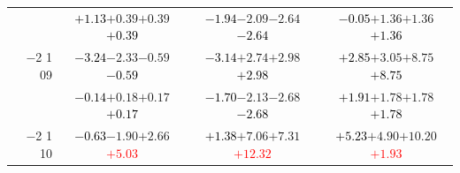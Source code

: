 \documentclass[compress]{beamer}
\begin{document}
\begin{frame}
\begin{tabular}{r | c | c | c}
          & \textcolor{black}{$+1.13$}\hspace{0.1 cm}$+0.39$\hspace{0.1 cm}$+0.39$\hspace{0.1 cm}\textcolor{black}{$+0.39$} & \textcolor{black}{$-1.94$}\hspace{0.1 cm}$-2.09$\hspace{0.1 cm}$-2.64$\hspace{0.1 cm}\textcolor{black}{$-2.64$} & \textcolor{black}{$-0.05$}\hspace{0.1 cm}$+1.36$\hspace{0.1 cm}$+1.36$\hspace{0.1 cm}\textcolor{black}{$+1.36$} \\
$-$2 1 09 & \textcolor{black}{$-3.24$}\hspace{0.1 cm}$-2.33$\hspace{0.1 cm}$-0.59$\hspace{0.1 cm}\textcolor{black}{$-0.59$} & \textcolor{black}{$-3.14$}\hspace{0.1 cm}$+2.74$\hspace{0.1 cm}$+2.98$\hspace{0.1 cm}\textcolor{black}{$+2.98$} & \textcolor{black}{$+2.85$}\hspace{0.1 cm}$+3.05$\hspace{0.1 cm}$+8.75$\hspace{0.1 cm}\textcolor{black}{$+8.75$} \\
          & \textcolor{black}{$-0.14$}\hspace{0.1 cm}$+0.18$\hspace{0.1 cm}$+0.17$\hspace{0.1 cm}\textcolor{black}{$+0.17$} & \textcolor{black}{$-1.70$}\hspace{0.1 cm}$-2.13$\hspace{0.1 cm}$-2.68$\hspace{0.1 cm}\textcolor{black}{$-2.68$} & \textcolor{black}{$+1.91$}\hspace{0.1 cm}$+1.78$\hspace{0.1 cm}$+1.78$\hspace{0.1 cm}\textcolor{black}{$+1.78$} \\
$-$2 1 10 & \textcolor{black}{$-0.63$}\hspace{0.1 cm}$-1.90$\hspace{0.1 cm}$+2.66$\hspace{0.1 cm}\textcolor{red}{$+5.03$} & \textcolor{black}{$+1.38$}\hspace{0.1 cm}$+7.06$\hspace{0.1 cm}$+7.31$\hspace{0.1 cm}\textcolor{red}{$+12.32$} & \textcolor{black}{$+5.23$}\hspace{0.1 cm}$+4.90$\hspace{0.1 cm}$+10.20$\hspace{0.1 cm}\textcolor{red}{$+1.93$} \\

\end{tabular}
\end{frame}
\end{document}
